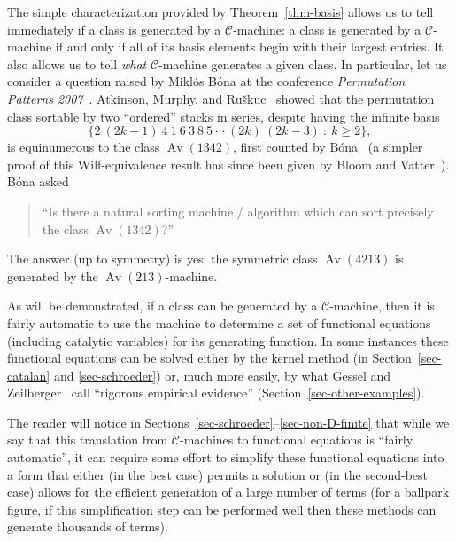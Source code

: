 \documentclass[10pt]{article}
\theoremstyle{plain}
\theoremstyle{definition}
\newcommand{\st}{\::\:}
\newcommand{\Av}{\operatorname{Av}}
\newcommand{\C}{\mathcal{C}}
\begin{document}
The simple characterization provided by Theorem~\ref{thm-basis} allows us to tell immediately if a class is generated by a $\C$-machine: a class is generated by a $\C$-machine if and only if all of its basis elements begin with their largest entries. It also allows us to tell \emph{what} $\C$-machine generates a given class. In particular, let us consider a question raised by Mikl\'os B\'ona at the conference \emph{Permutation Patterns 2007}~\cite[Question 4]{vatter:problems-and-co:}. Atkinson, Murphy, and Ru\v{s}kuc~\cite{atkinson:sorting-with-tw:} showed that the permutation class sortable by two ``ordered'' stacks in series, despite having the infinite basis
\[
	\{2\ (2k-1)\ 4\ 1\ 6\ 3\ 8\ 5\ \cdots\ (2k)\ (2k-3) \st k\ge 2\},
\]
is equinumerous to the class $\Av(1342)$, first counted by B\'ona~\cite{bona:exact-enumerati:} (a simpler proof of this Wilf-equivalence result has since been given by Bloom and Vatter~\cite{bloom:two-vignettes-o:}). B\'ona asked
\begin{quote}
	``Is there a natural sorting machine / algorithm which can sort precisely the class $\Av(1342)$?''
\end{quote}
The answer (up to symmetry) is yes: the symmetric class $\Av(4213)$ is generated by the $\Av(213)$-machine. %

As will be demonstrated, if a class can be generated by a $\C$-machine, then it is fairly automatic to use the machine to determine a set of functional equations (including catalytic variables) for its generating function. In some instances these functional equations can be solved either by the kernel method (in Section~\ref{sec-catalan} and \ref{sec-schroeder}) or, much more easily, by what Gessel and Zeilberger~\cite{gessel:an-empirical-me:} call ``rigorous empirical evidence'' (Section~\ref{sec-other-examples}).

The reader will notice in Sections~\ref{sec-schroeder}--\ref{sec-non-D-finite} that while we say that this translation from $\C$-machines to functional equations is ``fairly automatic'', it can require some effort to simplify these functional equations into a form that either (in the best case) permits a solution or (in the second-best case) allows for the efficient generation of a large number of terms (for a ballpark figure, if this simplification step can be performed well then these methods can generate thousands of terms).
\end{document}
